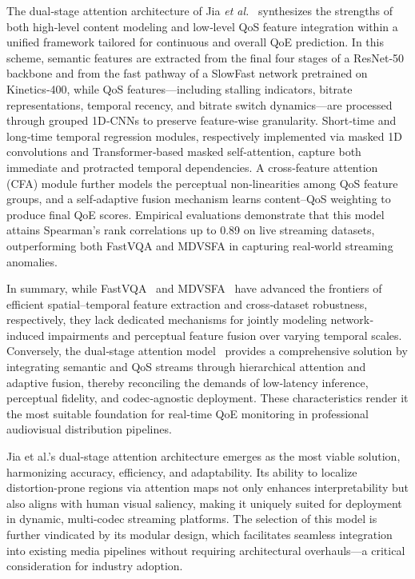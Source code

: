 The dual‐stage attention architecture of Jia \textit{et al.}~\cite{jia2024continuous} synthesizes the strengths of both high‐level content modeling and low‐level QoS feature integration within a unified framework tailored for continuous and overall QoE prediction. In this scheme, semantic features are extracted from the final four stages of a ResNet‐50 backbone and from the fast pathway of a SlowFast network pretrained on Kinetics‐400, while QoS features—including stalling indicators, bitrate representations, temporal recency, and bitrate switch dynamics—are processed through grouped 1D‐CNNs to preserve feature‐wise granularity. Short‐time and long‐time temporal regression modules, respectively implemented via masked 1D convolutions and Transformer‐based masked self‐attention, capture both immediate and protracted temporal dependencies. A cross‐feature attention (CFA) module further models the perceptual non‐linearities among QoS feature groups, and a self‐adaptive fusion mechanism learns content–QoS weighting to produce final QoE scores. Empirical evaluations demonstrate that this model attains Spearman’s rank correlations up to 0.89 on live streaming datasets, outperforming both FastVQA and MDVSFA in capturing real‐world streaming anomalies.

In summary, while FastVQA~\cite{wu2022fastvqa} and MDVSFA~\cite{li2023unified} have advanced the frontiers of efficient spatial–temporal feature extraction and cross‐dataset robustness, respectively, they lack dedicated mechanisms for jointly modeling network‐induced impairments and perceptual feature fusion over varying temporal scales. Conversely, the dual‐stage attention model~\cite{jia2024continuous} provides a comprehensive solution by integrating semantic and QoS streams through hierarchical attention and adaptive fusion, thereby reconciling the demands of low‐latency inference, perceptual fidelity, and codec‐agnostic deployment. These characteristics render it the most suitable foundation for real‐time QoE monitoring in professional audiovisual distribution pipelines.

Jia et al.’s dual-stage attention architecture emerges as the most viable solution, harmonizing accuracy, efficiency, and adaptability. Its ability to localize distortion-prone regions via attention maps not only enhances interpretability but also aligns with human visual saliency, making it uniquely suited for deployment in dynamic, multi-codec streaming platforms. The selection of this model is further vindicated by its modular design, which facilitates seamless integration into existing media pipelines without requiring architectural overhauls—a critical consideration for industry adoption.

